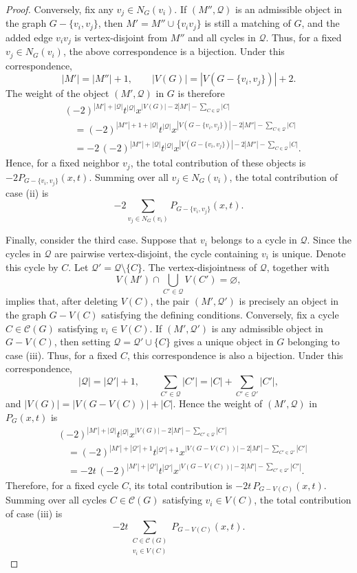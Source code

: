 \documentclass[11pt, a4paper]{article}
\begin{document}
\begin{proof}
Conversely, fix any $v_j\in N_G(v_i)$. If $(M'',\mathcal{Q})$ is
an admissible object in the graph $G-\{v_i,v_j\}$, then
$M'=M''\cup\{v_iv_j\}$
is still a matching of $G$, and the added edge $v_iv_j$ is vertex-disjoint from $M''$ and all cycles in $\mathcal{Q}$.
Thus, for a fixed $v_j\in N_G(v_i)$, the above correspondence is a bijection.
Under this correspondence,
\[
|M'|=|M''|+1,
\qquad
|V(G)|=|V(G-\{v_i,v_j\})|+2.
\]
The weight of the object $(M',\mathcal{Q})$ in $G$ is therefore
\begin{align*}
&(-2)^{|M'|+|\mathcal{Q}|}t^{|\mathcal{Q}|}
 x^{|V(G)|-2|M'|-\sum_{C\in \mathcal{Q}}|C|}
\\
&\quad=
(-2)^{|M''|+1+|\mathcal{Q}|}t^{|\mathcal{Q}|}
 x^{|V(G-\{v_i,v_j\})|-2|M''|-\sum_{C\in \mathcal{Q}}|C|}
\\
&\quad=
-2\,(-2)^{|M''|+|\mathcal{Q}|}t^{|\mathcal{Q}|}
 x^{|V(G-\{v_i,v_j\})|-2|M''|-\sum_{C\in \mathcal{Q}}|C|}.
\end{align*}
Hence, for a fixed neighbor $v_j$, the total contribution of these objects is
$-2P_{G-\{v_i,v_j\}}(x,t)$.
Summing over all $v_j\in N_G(v_i)$, the total contribution of case (ii) is
\[
-2\sum_{v_j\in N_G(v_i)}P_{G-\{v_i,v_j\}}(x,t).
\]

Finally, consider the third case.
Suppose that $v_i$ belongs to a cycle in $\mathcal{Q}$.
Since the cycles in $\mathcal{Q}$ are pairwise vertex-disjoint, the cycle containing $v_i$ is unique.
Denote this cycle by $C$. Let
$\mathcal{Q}'=\mathcal{Q}\setminus\{C\}$.
The vertex-disjointness of $\mathcal{Q}$, together with
\[
V(M')\cap\bigcup_{C'\in \mathcal{Q}}V(C')=\varnothing,
\]
implies that, after deleting $V(C)$, the pair $(M',\mathcal{Q}')$ is precisely an object in the graph
$G-V(C)$ satisfying the defining conditions.
Conversely, fix a cycle $C\in\mathcal{C}(G)$ satisfying $v_i\in V(C)$.
If $(M',\mathcal{Q}')$ is any admissible object in $G-V(C)$, then setting
$\mathcal{Q}=\mathcal{Q}'\cup\{C\}$
gives a unique object in $G$ belonging to case (iii). Thus,
for a fixed $C$, this correspondence is also a bijection.
Under this correspondence,
\[
|\mathcal{Q}|=|\mathcal{Q}'|+1,
\qquad
\sum_{C'\in \mathcal{Q}}|C'|
=|C|+\sum_{C'\in \mathcal{Q}'}|C'|,
\]
and $|V(G)|=|V(G-V(C))|+|C|$.
Hence the weight of $(M',\mathcal{Q})$ in $P_G(x,t)$ is
\begin{align*}
&(-2)^{|M'|+|\mathcal{Q}|}t^{|\mathcal{Q}|}
 x^{|V(G)|-2|M'|-\sum_{C'\in \mathcal{Q}}|C'|}
\\
&\quad=
(-2)^{|M'|+|\mathcal{Q}'|+1}t^{|\mathcal{Q}'|+1}
 x^{|V(G-V(C))|-2|M'|-\sum_{C'\in \mathcal{Q}'}|C'|}
\\
&\quad=
-2t\,(-2)^{|M'|+|\mathcal{Q}'|}t^{|\mathcal{Q}'|}
 x^{|V(G-V(C))|-2|M'|-\sum_{C'\in \mathcal{Q}'}|C'|}.
\end{align*}
Therefore, for a fixed cycle $C$, its total contribution is
$-2t\, P_{G-V(C)}(x,t)$.
Summing over all cycles $C\in\mathcal{C}(G)$ satisfying $v_i\in V(C)$,
the total contribution of case (iii) is
\[
-2t\sum_{\substack{C\in\mathcal{C}(G)\\v_i\in V(C)}}P_{G-V(C)}(x,t).
\]


\end{proof}
\end{document}
